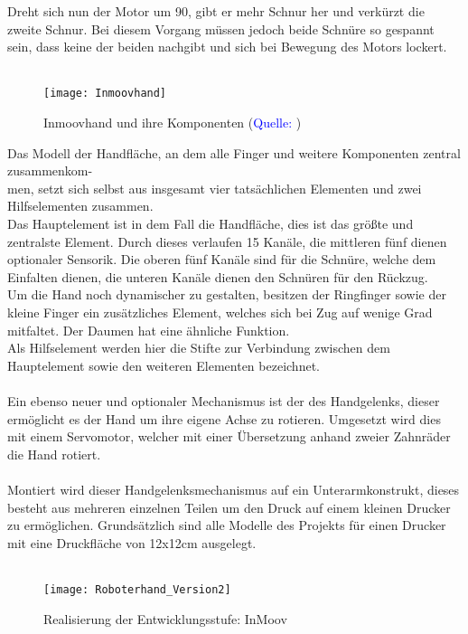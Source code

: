 \documentclass[titlepage,12pt,twoside]{article}
\begin{document}
Dreht sich nun der Motor um 90\textdegree, gibt er mehr Schnur her und verkürzt die zweite Schnur. Bei diesem Vorgang müssen jedoch beide Schnüre so gespannt sein, dass keine der beiden nachgibt und sich bei Bewegung des Motors lockert. \\
\\
\begin{figure}[H]
	\begin{center}
		\scalebox{0.8}
		{\texttt{[image: Inmoovhand]}}
		\caption{Inmoovhand und ihre Komponenten (\textcolor{blue}{Quelle: \cite{Inmoovhand}})}
		\label{fig:Inmoovhand}			
	\end{center}
\end{figure}
\hfill \break
Das Modell der Handfläche, an dem alle Finger und weitere Komponenten zentral zusammenkom-\\men, setzt sich selbst aus insgesamt vier tatsächlichen Elementen und zwei Hilfselementen zusammen. \\
Das Hauptelement ist in dem Fall die Handfläche, dies ist das größte und zentralste Element. Durch dieses verlaufen 15 Kanäle, die mittleren fünf dienen optionaler Sensorik. Die oberen fünf Kanäle sind für die Schnüre, 
welche dem Einfalten dienen, die unteren Kanäle dienen den Schnüren für den Rückzug. \\
Um die Hand noch dynamischer zu gestalten, besitzen der Ringfinger sowie der kleine Finger ein zusätzliches Element, welches sich bei Zug auf wenige Grad mitfaltet. Der Daumen hat eine ähnliche Funktion. \\
Als Hilfselement werden hier die Stifte zur Verbindung zwischen dem Hauptelement sowie den weiteren Elementen bezeichnet. \\
\\
\hfill \break
\hfill \break
Ein ebenso neuer und optionaler Mechanismus ist der des Handgelenks, dieser ermöglicht es der Hand um ihre eigene Achse zu rotieren. Umgesetzt wird dies mit einem Servomotor, welcher mit einer Übersetzung anhand zweier Zahnräder die Hand rotiert. \\
\\
Montiert wird dieser Handgelenksmechanismus auf ein Unterarmkonstrukt, dieses besteht aus mehreren einzelnen Teilen um den Druck auf einem kleinen Drucker zu ermöglichen. Grundsätzlich sind alle Modelle des Projekts  für einen Drucker 
mit eine Druckfläche von 12x12cm ausgelegt. \\
\\
\begin{figure}[H]
	\begin{center}
		\scalebox{1.2}
		{\texttt{[image: Roboterhand\_Version2]}}
		\caption{Realisierung der Entwicklungsstufe: InMoov}
		\label{fig:Roboterhand_Version2}			
	\end{center}
\end{figure}
\end{document}
